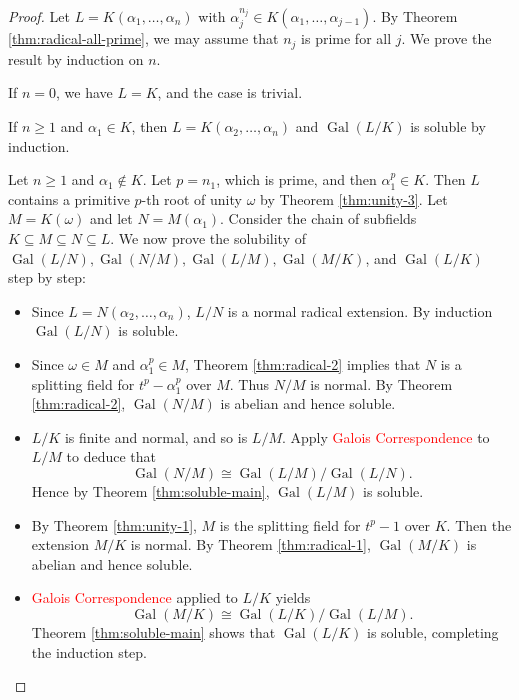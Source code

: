 \documentclass[12pt]{article}
\newcommand{\Gal}{\operatorname{Gal}}
\begin{document}
\begin{proof}
    Let $L=K\left(\alpha_1, \ldots, \alpha_n\right)$ with $\alpha_j^{n_j} \in
        K\left(\alpha_1, \ldots, \alpha_{j-1}\right)$. By Theorem
    \ref{thm:radical-all-prime}, we may assume that $n_j$ is prime for all $j$.
    We
    prove the result by induction on $n$.

    If $n = 0$, we have $L = K$, and the case is trivial.

    If $n \ge 1$ and $\alpha_1 \in K$, then $L=K\left(\alpha_2, \ldots,
        \alpha_n\right)$ and $\Gal(L / K)$ is soluble by induction.

    Let $n \ge 1$ and $\alpha_1 \notin K$. Let $p = n_1$, which is prime, and
    then
    $\alpha_1^p \in K$.  Then $L$ contains a primitive $p$-th root of unity
    $\omega$ by Theorem \ref{thm:unity-3}. Let $M = K(\omega)$ and let $N =
        M(\alpha_1)$. Consider the chain of subfields $K \subseteq M \subseteq
        N
        \subseteq L$. We now prove the solubility of $\Gal(L/N), \Gal(N/M),
        \Gal(L/M),
        \Gal(M/K)$, and $\Gal(L/K)$ step by step:

    \begin{itemize}
        \item Since $L=N\left(\alpha_2, \ldots, \alpha_n\right)$, $L / N$ is a
              normal radical extension. By induction $\Gal\left(L / N\right)$
              is soluble.
        \item Since $ \omega \in M$ and $\alpha_1^p \in M$, Theorem
              \ref{thm:radical-2} implies that $N$ is a splitting field for
              $t^p-\alpha_1^p$
              over $M$. Thus $N / M$ is normal. By Theorem \ref{thm:radical-2},
              $\Gal\left(N
                  / M\right)$ is abelian and hence soluble.
        \item  $L/ K$ is finite and normal, and so is $L / M$. Apply
              \textcolor{red}{Galois Correspondence} to $L / M$ to deduce that
              $$
                  \Gal\left( N / M \right) \cong \Gal(L / M) / \Gal\left(L /
                  N\right).
              $$
              Hence by Theorem \ref{thm:soluble-main},	$ \Gal(L / M)$ is
              soluble.
        \item By Theorem \ref{thm:unity-1}, $M$ is the splitting field for
              $t^p-1$
              over $K$. Then the extension $M / K$ is normal. By Theorem
              \ref{thm:radical-1},
              $\Gal(M / K)$ is abelian and hence soluble.
        \item  \textcolor{red}{Galois Correspondence} applied to $L / K$ yields
              $$
                  \Gal(M / K) \cong \Gal(L / K) / \Gal(L / M).
              $$
              Theorem \ref{thm:soluble-main} shows that $\Gal(L / K)$ is
              soluble,
              completing the induction step.
    \end{itemize}
\end{proof}
\end{document}

